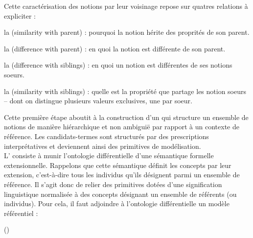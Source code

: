 Cette caractérisation des notions par leur voisinage repose sur quatres relations à expliciter : 
\begin{liste}
	\item la  (similarity with parent) : pourquoi la notion hérite des proprités de son parent.
	\item la  (difference with parent) : en quoi la notion est différente de son parent.
	\item la  (difference with siblings) : en quoi un notion est différentes de ses notions soeurs.
	\item la  (similarity with siblings) : quelle est la propriété que partage les notion soeurs -- dont on distingue plusieurs valeurs exclusives, une par soeur.\\ 		
\end{liste}

Cette première étape aboutit à la construction d'un  qui structure un ensemble de notions de manière hiérarchique et non ambiguië par rapport à un contexte de référence.
Les candidats-termes sont structurés par des prescriptions interprétatives et deviennent ainsi des primitives de modélisation.\\

\g{[2.]} L' consiste à munir l'ontologie différentielle d'une sémantique formelle extensionnelle.
Rappelons que cette sémantique définit les concepts par leur extension, c'est-à-dire tous les individus qu'ils désignent parmi un ensemble de référence. 
Il s'agit donc de relier des primitives dotées d'une signification linguistique normalisée à des concepts désignant un ensemble de référents (ou individus).
Pour cela, il faut adjoindre à l'ontologie différentielle un modèle référentiel : 

	 (\cite[p.148]{bachimont:icc})


